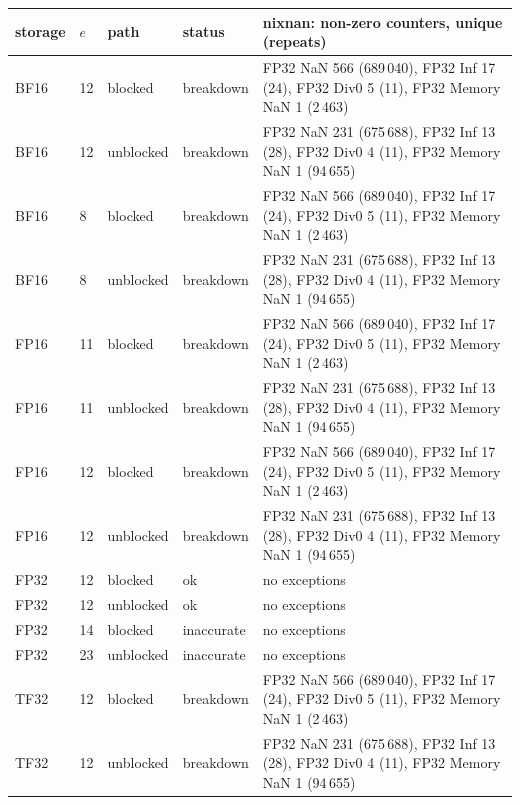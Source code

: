 \begin{tabular}{llllp{7.3cm}}
\toprule
storage & $e$ & path & status & nixnan: non-zero counters, unique (repeats)\\
\midrule
BF16 & 12 & blocked & breakdown & FP32 NaN 566 (689\,040), FP32 Inf 17 (24), FP32 Div0 5 (11), FP32 Memory NaN 1 (2\,463)\\
BF16 & 12 & unblocked & breakdown & FP32 NaN 231 (675\,688), FP32 Inf 13 (28), FP32 Div0 4 (11), FP32 Memory NaN 1 (94\,655)\\
BF16 & 8 & blocked & breakdown & FP32 NaN 566 (689\,040), FP32 Inf 17 (24), FP32 Div0 5 (11), FP32 Memory NaN 1 (2\,463)\\
BF16 & 8 & unblocked & breakdown & FP32 NaN 231 (675\,688), FP32 Inf 13 (28), FP32 Div0 4 (11), FP32 Memory NaN 1 (94\,655)\\
FP16 & 11 & blocked & breakdown & FP32 NaN 566 (689\,040), FP32 Inf 17 (24), FP32 Div0 5 (11), FP32 Memory NaN 1 (2\,463)\\
FP16 & 11 & unblocked & breakdown & FP32 NaN 231 (675\,688), FP32 Inf 13 (28), FP32 Div0 4 (11), FP32 Memory NaN 1 (94\,655)\\
FP16 & 12 & blocked & breakdown & FP32 NaN 566 (689\,040), FP32 Inf 17 (24), FP32 Div0 5 (11), FP32 Memory NaN 1 (2\,463)\\
FP16 & 12 & unblocked & breakdown & FP32 NaN 231 (675\,688), FP32 Inf 13 (28), FP32 Div0 4 (11), FP32 Memory NaN 1 (94\,655)\\
FP32 & 12 & blocked & ok & no exceptions\\
FP32 & 12 & unblocked & ok & no exceptions\\
FP32 & 14 & blocked & inaccurate & no exceptions\\
FP32 & 23 & unblocked & inaccurate & no exceptions\\
TF32 & 12 & blocked & breakdown & FP32 NaN 566 (689\,040), FP32 Inf 17 (24), FP32 Div0 5 (11), FP32 Memory NaN 1 (2\,463)\\
TF32 & 12 & unblocked & breakdown & FP32 NaN 231 (675\,688), FP32 Inf 13 (28), FP32 Div0 4 (11), FP32 Memory NaN 1 (94\,655)\\
\bottomrule
\end{tabular}
